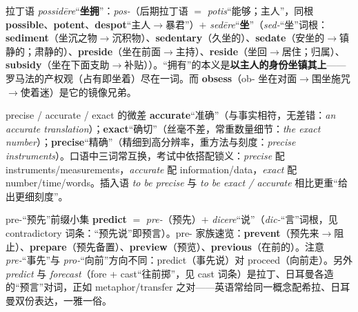 \documentclass[../main.tex]{subfiles}
\begin{document}
\begin{origin}
拉丁语 \textit{possidēre}“\textbf{坐拥}”：\textit{pos-}（后期拉丁语 $=$ \textit{potis}“能够；主人”，同根 \textbf{possible}、\textbf{potent}、\textbf{despot}“主人$\to$暴君”）$+$ \textit{sedēre}“\textbf{坐}”（\textit{sed-}“坐”词根：\textbf{sediment}（坐沉之物$\to$沉积物）、\textbf{sedentary}（久坐的）、\textbf{sedate}（安坐的$\to$镇静的；肃静的）、\textbf{preside}（坐在前面$\to$主持）、\textbf{reside}（坐回$\to$居住；归属）、\textbf{subsidy}（坐在下面支助$\to$补贴））。“拥有”的本义是\textbf{以主人的身份坐镇其上}——罗马法的产权观（占有即坐着）尽在一词。而 \textbf{obsess}（ob- 坐在对面$\to$围坐施咒$\to$使着迷）是它的镜像兄弟。
\end{origin}



\begin{gram}{precise / accurate / exact 的微差}
\textbf{accurate}“准确”（与事实相符，无差错：\textit{an accurate translation}）；\textbf{exact}“确切”（丝毫不差，常重数量细节：\textit{the exact number}）；\textbf{precise}“精确”（精细到高分辨率，重方法与刻度：\textit{precise instruments}）。口语中三词常互换，考试中依搭配锁义：\textit{precise} 配 instruments/measurements，\textit{accurate} 配 information/data，\textit{exact} 配 number/time/words。插入语 \textit{to be precise} 与 \textit{to be exact / accurate} 相比更重“给出更细刻度”。
\end{gram}



\begin{gram}{pre-“预先”前缀小集}
\textbf{predict} $=$ \textit{pre-}（预先）$+$ \textit{dicere}“说”（\textit{dic-}“言”词根，见 contradictory 词条：“预先说”即预言）。pre- 家族速览：\textbf{prevent}（预先来$\to$阻止）、\textbf{prepare}（预先备置）、\textbf{preview}（预览）、\textbf{previous}（在前的）。注意 \textit{pre-}“事先”与 \textit{pro-}“向前”方向不同：predict（事先说）对 proceed（向前走）。另外 \textit{predict} 与 \textit{forecast}（fore + cast“往前掷”，见 cast 词条）是拉丁、日耳曼各造的“预言”对词，正如 metaphor/transfer 之对——英语常给同一概念配希拉、日耳曼双份表达，一雅一俗。
\end{gram}
\end{document}
